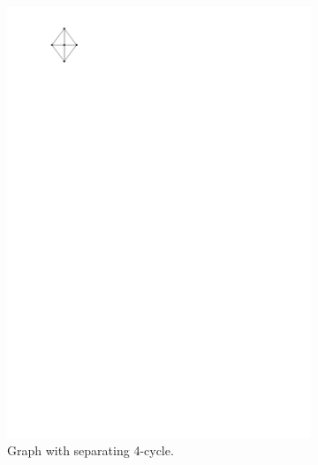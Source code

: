   \begin{figure}
    \centering
      \begin{subfigure}[t]{3cm}
        \centering
        \includegraphics[scale=1]{introduction/img/areaunivGraph.pdf}
        \caption{Graph with separating 4-cycle.}
      \end{subfigure}
      ~
      \begin{subfigure}[t]{3cm}
        \centering

\end{subfigure}
\end{figure}
